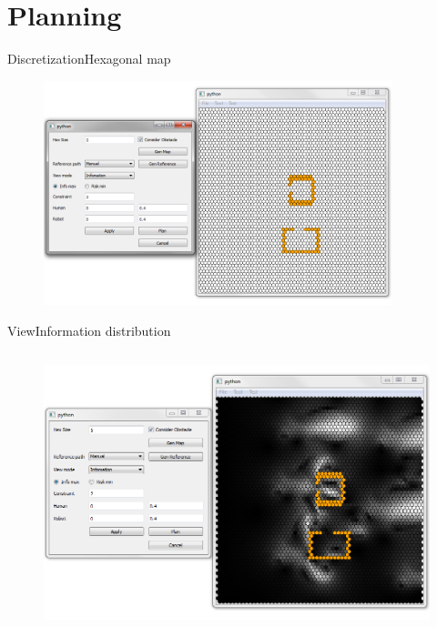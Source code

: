 \section{Planning}

\begin{frame}{Discretization}{Hexagonal map}

\begin{figure}
\centering
\includegraphics[width = 0.9\textwidth]{./screenshot/discretization.png}
\end{figure}

\end{frame}

\begin{frame}{View}{Information distribution}

\begin{columns}
\begin{figure}
\centering
\includegraphics[width = \textwidth]{./screenshot/information_view.png}
\end{figure}

\begin{minipage}{\textwidth}
\end{minipage}
\end{columns}

\end{frame}

